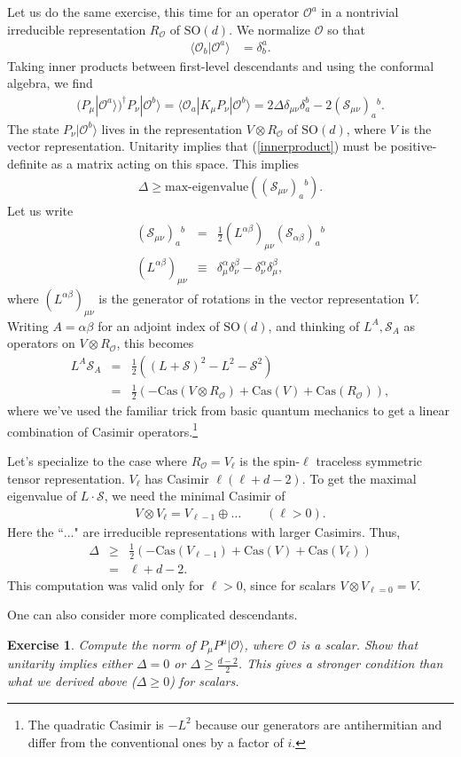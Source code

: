 \documentclass{ws-rv9x6}
\newcommand\be{\begin{eqnarray}}
\newcommand\ee{\end{eqnarray}}
\newcommand\cO{\mathcal{O}}
\newcommand\p[1]{\left(#1\right)}
\newcommand\<\langle
\renewcommand\>\rangle
\newcommand\de\delta
\newcommand\nn{\nonumber}
\renewcommand\.{\cdot}
\newcommand\SO{\mathrm{SO}}
\newcommand\De{\Delta}
\newcommand\cS{\mathcal{S}}
\renewcommand\b\beta
\renewcommand\a\alpha
\newtheorem{exercise}{Exercise}[section]
\begin{document}
Let us do the same exercise, this time for an operator $\cO^a$ in a nontrivial irreducible representation $R_\cO$ of $\SO(d)$. We normalize $\cO$ so that
\be
\<\cO_b|\cO^a\> &= \de^a_b.
\ee
Taking inner products between first-level descendants and using the conformal algebra, we find
\be
(P_\mu|\cO^a\>)^\dag P_\nu|\cO^b\> = \<\cO_a|K_\mu P_\nu|\cO^b\>
= 2\De\de_{\mu\nu}\de_a^b-2(\cS_{\mu\nu})_a{}^b.\label{innerproduct}
\ee
The state $P_\nu|\cO^b\>$ lives in the representation $V\otimes R_\cO$ of $\SO(d)$, where $V$ is the vector representation.
Unitarity implies that (\ref{innerproduct}) must be positive-definite as a matrix acting on this space.  This implies
\be
\De\geq \textrm{max-eigenvalue}((\cS_{\mu\nu})_a{}^b).
\ee
Let us write
\be
(\cS_{\mu\nu})_a{}^b &=& \frac 1 2 (L^{\a\b})_{\mu\nu}(\cS_{\a\b})_a{}^b\nn\\
(L^{\a\b})_{\mu\nu} &\equiv& \de^\a_\mu\de^\b_\nu - \de^\a_\nu\de^\b_\mu,
\ee
where $(L^{\a\b})_{\mu\nu}$ is the generator of rotations in the vector representation $V$.  Writing $A=\a\b$ for an adjoint index of $\SO(d)$, and thinking of $L^A,\cS_A$ as operators on $V\otimes R_\cO$, this becomes
\be
L^A \cS_A &=& \frac 1 2 \p{(L+\cS)^2-L^2 -\cS^2}\nn\\
&=& \frac 1 2\p{-\mathrm{Cas}(V\otimes R_\cO)+\mathrm{Cas}(V)+\mathrm{Cas}(R_\cO)},
\ee
where we've used the familiar trick from basic quantum mechanics to get a linear combination of Casimir operators.\footnote{The quadratic Casimir is $-L^2$ because our generators are antihermitian and differ from the conventional ones by a factor of $i$.}

Let's specialize to the case where $R_\cO=V_\ell$ is the spin-$\ell$ traceless symmetric tensor representation.  $V_\ell$ has Casimir $\ell(\ell+d-2)$.  To get the maximal eigenvalue of $L\.\cS$, we need the minimal Casimir of
\be
V\otimes V_\ell=V_{\ell-1}\oplus \dots\qquad(\ell>0).
\ee
Here the ``$\dots$" are irreducible representations with larger Casimirs.  Thus,
\be
\De &\geq& \frac 1 2\p{-\mathrm{Cas}(V_{\ell-1})+\mathrm{Cas}(V)+\mathrm{Cas}(V_\ell)}\nn\\
&=& \ell+d-2.
\ee
This computation was valid only for $\ell> 0$, since for scalars $V\otimes V_{\ell=0}=V$.

One can also consider more complicated descendants.
\begin{exercise}
Compute the norm of $P_\mu P^\mu |\cO\>$, where $\cO$ is a scalar.  Show that unitarity implies either $\De=0$ or $\De\geq \frac{d-2}{2}$.  This gives a stronger condition than what we derived above ($\De\geq 0$) for scalars.
\end{exercise}
\end{document}
